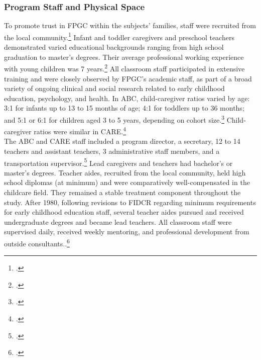 \subsubsection{Program Staff and Physical Space}
\noindent To promote trust in FPGC within the subjects' families, staff were recruited from the local community.\footnote{\citet{Ramey-et-al_1977_Intro-to-ABC, Bryant_et_al_1987_Carolina_Approach_TIECSE, Feagans_1996_Childrens-Talk,abc2014-2015interviews}.} Infant and toddler caregivers and preschool teachers demonstrated varied educational backgrounds ranging from high school graduation to master's degrees. Their average professional working experience with young children was 7 years.\footnote{\citet{Ramey_McGinness_etal_1982_Abecedarianapproach, Ramey_etal_1985_Project-CARE_TiECSE, Wasik_Ramey_etal_1990_CD}.} All classroom staff participated in extensive training and were closely observed by FPGC's academic staff, as part of a broad variety of ongoing clinical and social research related to early childhood education, psychology, and health. In ABC, child-caregiver ratios varied by age: 3:1 for infants up to 13 to 15 months of age; 4:1 for toddlers up to 36 months; and 5:1 or 6:1 for children aged 3 to 5 years, depending on cohort size.\footnote{\citet{Ramey-et-al_1977_Intro-to-ABC,Ramey_Campbell_1979_SR,Ramey_McGinness_etal_1982_Abecedarianapproach}.} Child-caregiver ratios were similar in CARE.\footnote{\citet{Burchinal_Campbell_etal_1997_CD, Ramey_etal_1985_Project-CARE_TiECSE}.}\\

\noindent The ABC and CARE staff included a program director, a secretary, 12 to 14 teachers and assistant teachers, 3 administrative staff members, and a transportation supervisor.\footnote{\citet{Ramey-et-al_1977_Intro-to-ABC,Ramey_McGinness_etal_1982_Abecedarianapproach, Bryant_et_al_1987_Carolina_Approach_TIECSE}.} Lead caregivers and teachers had bachelor's or master's degrees. Teacher aides, recruited from the local community, held high school diplomas (at minimum) and were comparatively well-compensated in the childcare field. They remained a stable treatment component throughout the study. After 1980, following revisions to FIDCR regarding minimum requirements for early childhood education staff, several teacher aides pursued and received undergraduate degrees and became lead teachers. All classroom staff were supervised daily, received weekly mentoring, and professional development from outside consultants..\footnote{\citet{Obrien-Sanders_1974_ABC-brochure, Ramey_etal_1985_Project-CARE_TiECSE, Sanders-Stokes_1979_Status-Report,Klein-Sanders_1982_Status-Report,abc2014-2015interviews}.}\\

